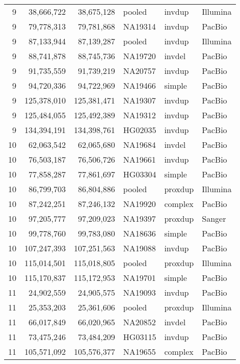 {\begin{longtable}{rrrlll}
    9   & 38,666,722  & 38,675,128  & pooled  & invdup  & Illumina  \\
    9   & 79,778,313  & 79,781,868  & NA19314 & invdup  & PacBio  \\
    9   & 87,133,944  & 87,139,287  & pooled  & invdup  & Illumina  \\
    9   & 88,741,878  & 88,745,736  & NA19720 & invdel  & PacBio  \\
    9   & 91,735,559  & 91,739,219  & NA20757 & invdup  & PacBio  \\
    9   & 94,720,336  & 94,722,969  & NA19466 & simple  & PacBio  \\
    9   & 125,378,010 & 125,381,471 & NA19307 & invdup  & PacBio  \\
    9   & 125,484,055 & 125,492,389 & NA19312 & invdup  & PacBio  \\
    9   & 134,394,191 & 134,398,761 & HG02035 & invdup  & PacBio  \\
    10  & 62,063,542  & 62,065,680  & NA19684 & invdel  & PacBio  \\
    10  & 76,503,187  & 76,506,726  & NA19661 & invdup  & PacBio  \\
    10  & 77,858,287  & 77,861,697  & HG03304 & simple  & PacBio  \\
    10  & 86,799,703  & 86,804,886  & pooled  & proxdup & Illumina  \\
    10  & 87,242,251  & 87,246,132  & NA19920 & complex & PacBio  \\
    10  & 97,205,777  & 97,209,023  & NA19397 & proxdup & Sanger  \\
    10  & 99,778,760  & 99,783,080  & NA18636 & simple  & PacBio  \\
    10  & 107,247,393 & 107,251,563 & NA19088 & invdup  & PacBio  \\
    10  & 115,014,501 & 115,018,805 & pooled  & proxdup & Illumina  \\
    10  & 115,170,837 & 115,172,953 & NA19701 & simple  & PacBio  \\
    11  & 24,902,559  & 24,905,575  & NA19093 & invdup  & PacBio  \\
    11  & 25,353,203  & 25,361,606  & pooled  & proxdup & Illumina  \\
    11  & 66,017,849  & 66,020,965  & NA20852 & invdel  & PacBio  \\
    11  & 73,475,246  & 73,484,209  & HG03115 & invdup  & PacBio  \\
    11  & 105,571,092 & 105,576,377 & NA19655 & complex & PacBio  \\

\end{longtable}}
